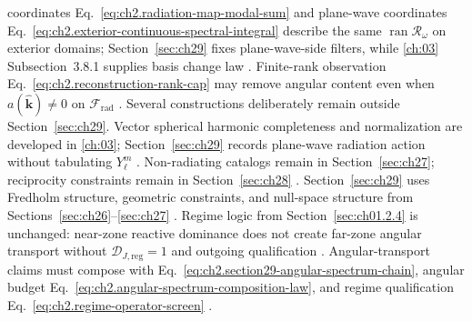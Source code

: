 coordinates Eq.~\eqref{eq:ch2.radiation-map-modal-sum} and plane-wave coordinates
Eq.~\eqref{eq:ch2.exterior-continuous-spectral-integral} describe the same
\(\operatorname{ran}\mathcal{R}_\omega\) on exterior domains; Section~\ref{sec:ch29} fixes
plane-wave-side filters, while \ref{ch:03} Subsection~3.8.1 supplies basis
change law \cite{stratton1941}. Finite-rank observation
Eq.~\eqref{eq:ch2.reconstruction-rank-cap} may remove angular content even when
\(a(\widehat{\mathbf{k}})\neq 0\) on \(\mathcal{F}_{\mathrm{rad}}\) \cite{stratton1941}.
Several constructions deliberately remain outside Section~\ref{sec:ch29}. Vector spherical
harmonic completeness and normalization are developed in \ref{ch:03}; Section~\ref{sec:ch29}
records plane-wave radiation action without tabulating \(Y_\ell^m\)
\cite{stratton1941}. Non-radiating catalogs remain in Section~\ref{sec:ch27};
reciprocity constraints remain in Section~\ref{sec:ch28} \cite{stratton1941}. Section~\ref{sec:ch29}
uses Fredholm structure, geometric constraints, and null-space structure from
Sections~\ref{sec:ch26}--\ref{sec:ch27} \cite{harrington2001}.
Regime logic from Section~\ref{sec:ch01.2.4} is unchanged: near-zone reactive dominance does not
create far-zone angular transport without \(\mathcal{D}_{J,\mathrm{reg}}=1\) and outgoing
qualification \cite{stratton1941}. Angular-transport claims must compose with
Eq.~\eqref{eq:ch2.section29-angular-spectrum-chain}, angular budget
Eq.~\eqref{eq:ch2.angular-spectrum-composition-law}, and regime qualification
Eq.~\eqref{eq:ch2.regime-operator-screen} \cite{harrington2001}.
